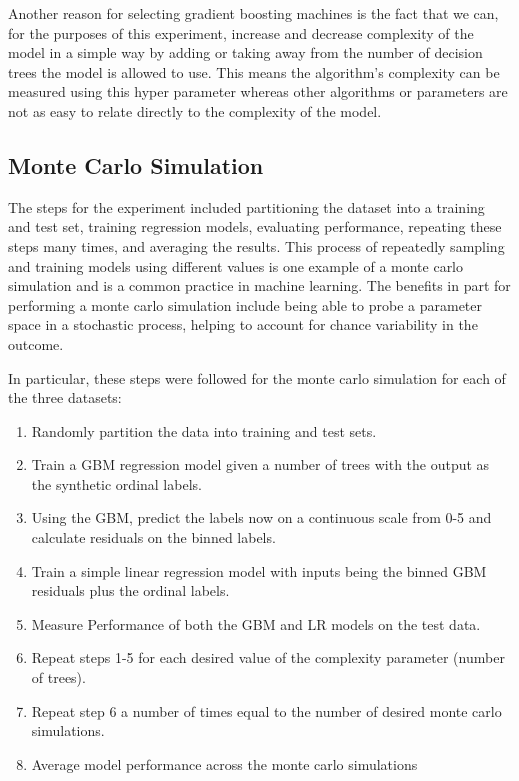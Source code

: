 \documentclass[10pt]{article}\usepackage[]{graphicx}\usepackage[]{xcolor}
\begin{document}
Another reason for selecting gradient boosting machines is the fact that we can, for the purposes of this experiment, increase and decrease complexity of the model in a simple way by adding or taking away from the number of decision trees the model is allowed to use. This means the algorithm's complexity can be measured using this hyper parameter whereas other algorithms or parameters are not as easy to relate directly to the complexity of the model.




\subsection{Monte Carlo Simulation}
The steps for the experiment included partitioning the dataset into a training and test set, training regression models, evaluating performance, repeating these steps many times, and averaging the results. This process of repeatedly sampling and training models using different values is one example of a monte carlo simulation and is a common practice in machine learning. The benefits in part for performing a monte carlo simulation include being able to probe a parameter space in a stochastic process, helping to account for chance variability in the outcome.

In particular, these steps were followed for the monte carlo simulation for each of the three datasets:

\begin{singlespace}
  \begin{enumerate}
    \item{Randomly partition the data into training and test sets.}
    \item{Train a GBM regression model given a number of trees with the output as the synthetic ordinal labels.}
    \item{Using the GBM, predict the labels now on a continuous scale from 0-5 and calculate residuals on the binned labels.}
    \item{Train a simple linear regression model with inputs being the binned GBM residuals plus the ordinal labels.}
    \item{Measure Performance of both the GBM and LR models on the test data.}
    \item{Repeat steps 1-5 for each desired value of the complexity parameter (number of trees).}
    \item{Repeat step 6 a number of times equal to the number of desired monte carlo simulations.}
    \item{Average model performance across the monte carlo simulations}
  \end{enumerate}
\end{singlespace}
\end{document}
